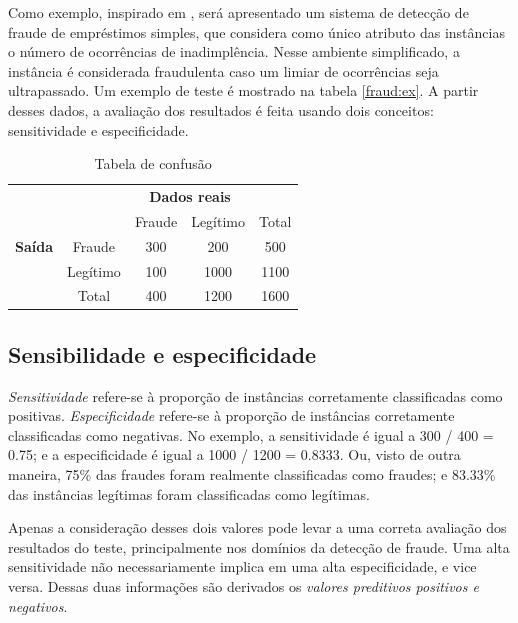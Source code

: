 Como exemplo, inspirado em \citet{Bewick2004}, será apresentado um sistema de detecção de fraude de empréstimos simples, que considera como único atributo das instâncias o número de ocorrências de inadimplência. Nesse ambiente simplificado, a instância é considerada fraudulenta caso um limiar de ocorrências seja ultrapassado. Um exemplo de teste é mostrado na tabela \ref{fraud:ex}. A partir desses dados, a avaliação dos resultados é feita usando dois conceitos: sensitividade e especificidade.

\renewcommand{\arraystretch}{1.5}
\vspace{2mm}
\begin{table}[h!]
    \centering
    \begin{tabular}{c l c c c}
        & & \multicolumn{2}{c}{\textbf{Dados reais}} \\
        \multirow{3}{5mm}{\begin{sideways}\parbox{20mm}{\textbf{Saída}}\end{sideways}} & \multicolumn{1}{c|}{} & Fraude & Legítimo & \multicolumn{1}{|c}{Total} \\
        \cline{2-5}
        & \multicolumn{1}{c|}{Fraude}   & 300 & 200   & \multicolumn{1}{|c}{500}  \\
        & \multicolumn{1}{c|}{Legítimo} & 100 & 1000  & \multicolumn{1}{|c}{1100} \\
        \cline{2-5}
        & \multicolumn{1}{c|}{Total}    & 400 & 1200  & \multicolumn{1}{|c}{1600} \\
    \end{tabular}
    \caption{Tabela de confusão}
    \label{fraud:confusion}
\end{table}
\vspace{2mm}

\subsection{Sensibilidade e especificidade}

\emph{Sensitividade} refere-se à proporção de instâncias corretamente classificadas como positivas. \emph{Especificidade} refere-se à proporção de instâncias corretamente classificadas como negativas. No exemplo, a sensitividade é igual a 300 / 400 = 0.75; e a especificidade é igual a 1000 / 1200 = 0.8333. Ou, visto de outra maneira, 75\% das fraudes foram realmente classificadas como fraudes; e 83.33\% das instâncias legítimas foram classificadas como legítimas.

Apenas a consideração desses dois valores pode levar a uma correta avaliação dos resultados do teste, principalmente nos domínios da detecção de fraude. Uma alta sensitividade não necessariamente implica em uma alta especificidade, e vice versa. Dessas duas informações são derivados os \emph{valores preditivos positivos e negativos}.

